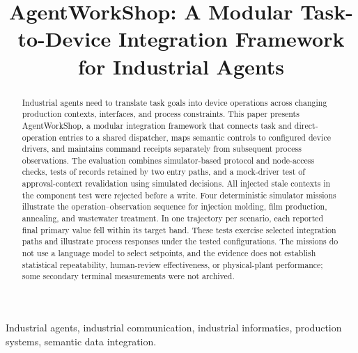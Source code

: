 \documentclass[journal]{IEEEtran}
\begin{document}

\title{AgentWorkShop: A Modular Task-to-Device Integration Framework for Industrial Agents}

\author{}

\maketitle

\begin{abstract}
Industrial agents need to translate task goals into device operations across
changing production contexts, interfaces, and process constraints. This paper
presents AgentWorkShop, a modular integration framework that connects task and
direct-operation entries to a shared dispatcher, maps semantic controls to
configured device drivers, and maintains command receipts separately from
subsequent process observations. The evaluation combines simulator-based
protocol and node-access checks, tests of records retained by two entry paths,
and a mock-driver test of approval-context revalidation using simulated
decisions. All injected stale contexts in the component test were rejected
before a write. Four deterministic
simulator missions illustrate the operation--observation sequence for injection
molding, film production, annealing, and wastewater treatment. In one trajectory
per scenario, each reported final primary value fell within its target band.
These tests exercise selected integration paths and illustrate process
responses under the tested configurations. The missions do not use a language
model to select setpoints, and the evidence does not establish statistical
repeatability, human-review effectiveness, or physical-plant performance;
some secondary terminal measurements were not archived.
\end{abstract}

\begin{IEEEkeywords}
Industrial agents, industrial communication, industrial informatics,
production systems, semantic data integration.
\end{IEEEkeywords}

\IEEEpeerreviewmaketitle








\balance


\end{document}
